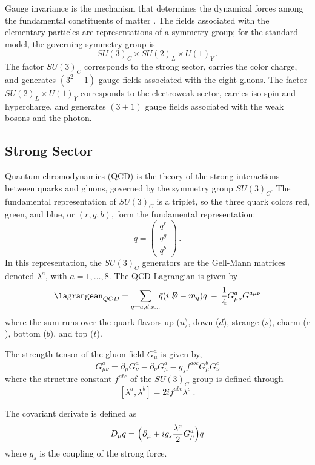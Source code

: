 Gauge invariance is the mechanism that determines the dynamical forces among the fundamental constituents of matter \cite{Pich:2012sx}. The fields associated with the elementary particles are representations of a symmetry group; for the standard model, the governing symmetry group is
\begin{equation}
SU(3)_C \times SU(2)_L \times U(1)_Y\,. \label{group}
\end{equation}
The factor $SU(3)_C$ corresponds to the strong sector, carries the color charge, and generates $(3^2-1)$ gauge fields associated with the eight gluons. The factor $SU(2)_L\times U(1)_Y$ corresponds to the electroweak sector, carries iso-spin and hypercharge, and generates $(3+1)$ gauge fields associated with the weak bosons and the photon.

\subsection{Strong Sector}
Quantum chromodynamics (QCD) is the theory of the strong interactions between quarks and gluons, governed by the symmetry group $SU(3)_C$. The fundamental representation of $SU(3)_C$ is a triplet, so the three quark colors red, green, and blue, or $(r, g, b)$, form the fundamental representation:
\begin{equation}
q = \left(\begin{array}{c} q^r\\ q^g\\ q^b \end{array} \right)\,.
\end{equation}
In this representation, the $SU(3)_C$ generators are the Gell-Mann matrices denoted $\lambda^a$, with $a=1,\ldots ,8$. The QCD Lagrangian is given by
\begin{equation}
\lagrangean_{QCD}=\sum_{q=u,d,s\ldots}\!\!\bar{q}(i\not\!\!D - m_q)q \: - \: \frac{1}{4}G_{\mu\nu}^a G^{a\mu\nu}
\label{Lqcd}
\end{equation}
where the sum runs over the quark flavors up ($u$), down ($d$), strange ($s$), charm ($c$), bottom ($b$), and top ($t$). 

The strength tensor of the gluon field $G_\mu^a$ is given by,
\[
G_{\mu\nu}^a = \partial_\mu G_\nu^a-\partial_\nu G_\mu^a-g_s f^{abc}G_\mu^bG_\nu^c
\]
where the structure constant $f^{abc}$ of the $SU(3)_C$ group is defined through 
\[
[\lambda^a,\lambda^b]=2if^{abc}\lambda^c \; . 
\]

The covariant derivate is defined as
\begin{equation}
D_\mu q = \Bigl(\partial_\mu +ig_s\frac{\lambda^a}{2}G_\mu^a\Bigr)q
\end{equation}
where $g_s$ is the coupling of the strong force. 

